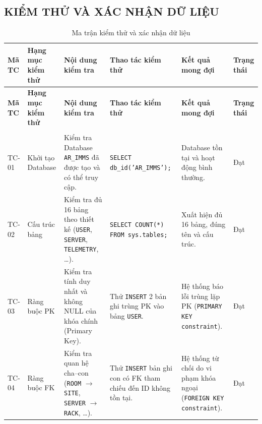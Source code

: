 \subsection{KIỂM THỬ VÀ XÁC NHẬN DỮ LIỆU}

\begin{longtable}{
    |>{\centering\arraybackslash}p{0.9cm}|
    >{\raggedright\arraybackslash}p{2.0cm}|
    >{\raggedright\arraybackslash}p{3.2cm}|
    >{\raggedright\arraybackslash}p{3.5cm}|
    >{\raggedright\arraybackslash}p{3.5cm}|
    >{\centering\arraybackslash}p{1.0cm}|
}

\caption{Ma trận kiểm thử và xác nhận dữ liệu}
\label{tab:test_cases}
\\
\hline

\textbf{Mã TC}
&
\textbf{Hạng mục kiểm thử}
&
\textbf{Nội dung kiểm tra}
&
\textbf{Thao tác kiểm thử}
&
\textbf{Kết quả mong đợi}
&
\textbf{Trạng thái}
\\
\hline

\endfirsthead

\hline
\textbf{Mã TC}
&
\textbf{Hạng mục kiểm thử}
&
\textbf{Nội dung kiểm tra}
&
\textbf{Thao tác kiểm thử}
&
\textbf{Kết quả mong đợi}
&
\textbf{Trạng thái}
\\
\hline

\endhead

\hline
\multicolumn{6}{r}{\textit{Tiếp tục ở trang sau}}\\
\endfoot

\hline
\endlastfoot

TC-01
&
Khởi tạo Database
&
Kiểm tra Database \texttt{AR\_IMMS} đã được tạo và có thể truy cập.
&
\texttt{SELECT db\_id('AR\_IMMS');}
&
Database tồn tại và hoạt động bình thường.
&
Đạt
\\ \hline

TC-02
&
Cấu trúc bảng
&
Kiểm tra đủ 16 bảng theo thiết kế
(\texttt{USER}, \texttt{SERVER}, \texttt{TELEMETRY}, \ldots).
&
\texttt{SELECT COUNT(*) FROM sys.tables;}
&
Xuất hiện đủ 16 bảng, đúng tên và cấu trúc.
&
Đạt
\\ \hline

TC-03
&
Ràng buộc PK
&
Kiểm tra tính duy nhất và không NULL của khóa chính (Primary Key).
&
Thử \texttt{INSERT} 2 bản ghi trùng PK vào bảng \texttt{USER}.
&
Hệ thống báo lỗi trùng lặp PK
(\texttt{PRIMARY KEY constraint}).
&
Đạt
\\ \hline

TC-04
&
Ràng buộc FK
&
Kiểm tra quan hệ cha--con
(\texttt{ROOM} $\rightarrow$ \texttt{SITE},
\texttt{SERVER} $\rightarrow$ \texttt{RACK}, \ldots).
&
Thử \texttt{INSERT} bản ghi con có FK tham chiếu đến ID không tồn tại.
&
Hệ thống từ chối do vi phạm khóa ngoại
(\texttt{FOREIGN KEY constraint}).
&
Đạt
\\ \hline


\end{longtable}
